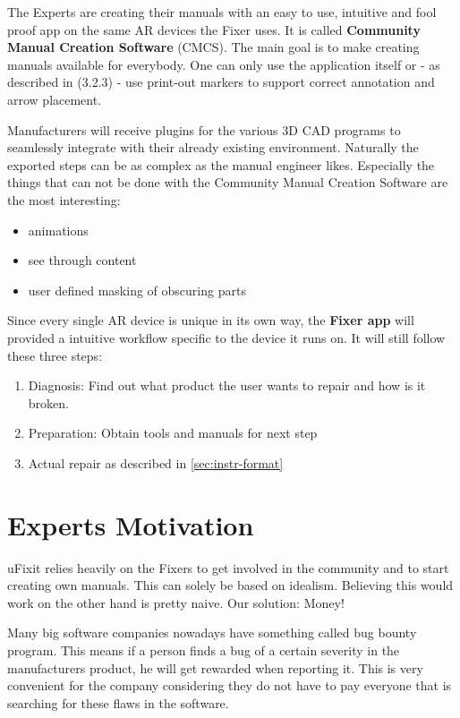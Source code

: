 		The Experts are creating their manuals with an easy to use, intuitive and fool proof app on the same AR devices the Fixer uses. It is called \textbf{Community Manual Creation Software} (CMCS). The main goal is to make creating manuals available for everybody. One can only use the application itself or - as described in (3.2.3) - use print-out markers to support correct annotation and arrow placement.
		
		Manufacturers will receive plugins for the various 3D CAD programs to seamlessly integrate with their already existing environment. Naturally the exported steps can be as complex as the manual engineer likes. Especially the things that can not be done with the Community Manual Creation Software are the most interesting:
		
		\begin{itemize}
			\itemsep0em
			\item animations
			\item see through content
			\item user defined masking of obscuring parts
		\end{itemize}
		
		Since every single AR device is unique in its own way, the \textbf{Fixer app} will provided a intuitive workflow specific to the device it runs on. It will still follow these three steps:
		
		\begin{enumerate}
			\itemsep0em
			\item Diagnosis: Find out what product the user wants to repair and how is it broken.
			\item Preparation: Obtain tools and manuals for next step
			\item Actual repair as described in \eqref{sec:instr-format}
		\end{enumerate}
		
		
	\section{Experts Motivation}
	
		uFixit relies heavily on the Fixers to get involved in the community and to start creating own manuals. This can solely be based on idealism. Believing this would work on the other hand is pretty naive. Our solution: Money!
		
		Many big software companies nowadays have something called bug bounty program. This means if a person finds a bug of a certain severity in the manufacturers product, he will get rewarded when reporting it. This is very convenient for the company considering they do not have to pay everyone that is searching for these flaws in the software.
		
